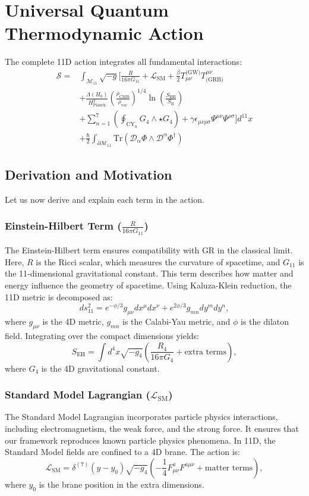 \documentclass[12pt, a4paper]{article}
\begin{document}
\section{Universal Quantum Thermodynamic Action}
The complete 11D action integrates all fundamental interactions:
\[
\boxed{
\begin{aligned}
\mathcal{S} = & \int_{\mathcal{M}_{11}} \sqrt{-g} \Bigg[ \frac{R}{16\pi G_{11}} + \mathcal{L}_{\text{SM}} + \frac{\beta}{2} T_{\mu\nu}^{\text{(GW)}} T^{\mu\nu}_{\text{(GRB)}} \\
& + \frac{\Lambda(H_0)}{H_{\text{Planck}}^2} \left( \frac{\rho_{\text{CMB}}}{\rho_{\text{vac}}} \right)^{1/4} \ln\left(\frac{S_{\text{BH}}}{S_{\text{B}}}\right) \\
& + \sum_{n=1}^7 \left( \oint_{\text{CY}_n} G_4 \wedge \star G_4 \right) + \gamma \epsilon_{\mu\nu\rho\sigma} \Psi^{\mu\nu} \Psi^{\rho\sigma} \Bigg] d^{11}x \\
& + \frac{\hbar}{2} \int_{\partial\mathcal{M}_{11}} \text{Tr}\left( \mathcal{D}_\alpha \Phi \wedge \mathcal{D}^\alpha \Phi^\dagger \right)
\end{aligned}
}
\]

\subsection{Derivation and Motivation}
Let us now derive and explain each term in the action.

\subsubsection{Einstein-Hilbert Term ($\frac{R}{16\pi G_{11}}$)}
The Einstein-Hilbert term ensures compatibility with GR in the classical limit. Here, \(R\) is the Ricci scalar, which measures the curvature of spacetime, and \(G_{11}\) is the 11-dimensional gravitational constant. This term describes how matter and energy influence the geometry of spacetime. Using Kaluza-Klein reduction, the 11D metric is decomposed as:
\[
ds^2_{11} = e^{-\phi/3} g_{\mu\nu}dx^\mu dx^\nu + e^{2\phi/3} g_{mn}dy^m dy^n,
\]
where \(g_{\mu\nu}\) is the 4D metric, \(g_{mn}\) is the Calabi-Yau metric, and \(\phi\) is the dilaton field. Integrating over the compact dimensions yields:
\[
S_{\text{EH}} = \int d^4x \sqrt{-g_4} \left( \frac{R_4}{16\pi G_4} + \text{extra terms} \right),
\]
where \(G_4\) is the 4D gravitational constant.

\subsubsection{Standard Model Lagrangian ($\mathcal{L}_{\text{SM}}$)}
The Standard Model Lagrangian incorporates particle physics interactions, including electromagnetism, the weak force, and the strong force. It ensures that our framework reproduces known particle physics phenomena. In 11D, the Standard Model fields are confined to a 4D brane. The action is: \\
\[
\mathcal{L}_{\text{SM}} = \delta^{(7)}(y - y_0) \sqrt{-g_4} \left( -\frac{1}{4} F_{\mu\nu}^a F^{a\mu\nu} + \text{matter terms} \right),
\]
where \(y_0\) is the brane position in the extra dimensions.
\end{document}
